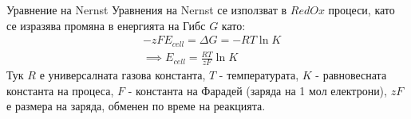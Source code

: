 \begin{frame}[t]{Уравнение на Nernst}
    Уравнения на Nernst се използват в $RedOx$ процеси, като се изразява промяна в енергията на Гибс $G$ като:
    \begin{align*}
        &-zFE_{cell} = \Delta G = -RT \ln K \\
        &\implies E_{cell} = \frac{RT}{zF} \ln K
    \end{align*}
    Тук $R$ е универсалната газова константа, $T$ - температурата, $K$ - равновесната константа на процеса,
    $F$ - константа на Фарадей (заряда на 1 мол електрони), $zF$ е размера на заряда, обменен по време на реакцията.
\end{frame}
